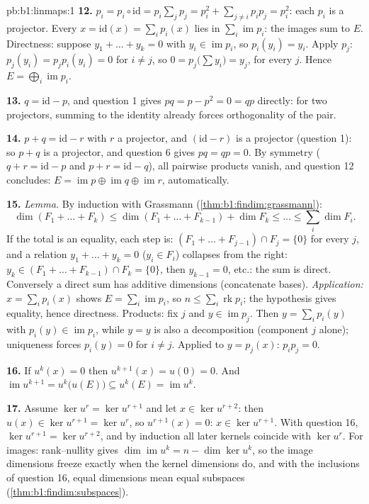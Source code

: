 \begin{solution}{pb:b1:linmaps:1}
\textbf{12.} $p_i = p_i \circ \mathrm{id} = p_i\sum_j p_j =
p_i^2 + \sum_{j \neq i} p_i p_j = p_i^2$: each $p_i$ is a
projector. Every $x = \mathrm{id}(x) = \sum_i p_i(x)$ lies in
$\sum_i \operatorname{im} p_i$: the images sum to $E$.
Directness: suppose $y_1 + \dots + y_k = 0$ with $y_i \in
\operatorname{im} p_i$, so $p_i(y_i) = y_i$. Apply $p_j$: $p_j
(y_i) = p_j p_i (y_i) = 0$ for $i \neq j$, so $0 = p_j\bigl(\sum
y_i\bigr) = y_j$, for every $j$. Hence $E = \bigoplus_i
\operatorname{im} p_i$.

\textbf{13.} $q = \mathrm{id} - p$, and question 1 gives $pq =
p - p^2 = 0 = qp$ directly: for two projectors, summing to the
identity already forces orthogonality of the pair.

\textbf{14.} $p + q = \mathrm{id} - r$ with $r$ a projector, and
$(\mathrm{id} - r)$ is a projector (question 1): so $p + q$ is a
projector, and question 6 gives $pq = qp = 0$. By symmetry ($q +
r = \mathrm{id} - p$ and $p + r = \mathrm{id} - q$), all
pairwise products vanish, and question 12 concludes: $E =
\operatorname{im} p \oplus \operatorname{im} q \oplus
\operatorname{im} r$, automatically.

\textbf{15.} \emph{Lemma.} By induction with Grassmann
(\cref{thm:b1:findim:grassmann}):
\[
\dim(F_1 + \dots + F_k) \leq \dim(F_1 + \dots + F_{k-1}) + \dim
F_k \leq \dots \leq \sum_i \dim F_i .
\]
If the total is an equality, each step is: $(F_1 + \dots +
F_{j-1}) \cap F_j = \{0\}$ for every $j$, and a relation $y_1 +
\dots + y_k = 0$ ($y_i \in F_i$) collapses from the right: $y_k
\in (F_1 + \dots + F_{k-1}) \cap F_k = \{0\}$, then $y_{k-1} =
0$, etc.: the sum is direct. Conversely a direct sum has
additive dimensions (concatenate bases). \emph{Application:}
$x = \sum_i p_i(x)$ shows $E = \sum_i \operatorname{im} p_i$,
so $n \leq \sum_i \operatorname{rk} p_i$; the hypothesis gives
equality, hence directness. Products: fix $j$ and $y \in
\operatorname{im} p_j$. Then $y = \sum_i p_i(y)$ with $p_i(y)
\in \operatorname{im} p_i$, while $y = y$ is also a
decomposition (component $j$ alone); uniqueness forces $p_i(y)
= 0$ for $i \neq j$. Applied to $y = p_j(x)$: $p_i p_j = 0$.

\textbf{16.} If $u^k(x) = 0$ then $u^{k+1}(x) = u(0) = 0$. And
$\operatorname{im} u^{k+1} = u^k\bigl(u(E)\bigr) \subseteq
u^k(E) = \operatorname{im} u^k$.

\textbf{17.} Assume $\ker u^{r} = \ker u^{r+1}$ and let $x \in
\ker u^{r+2}$: then $u(x) \in \ker u^{r+1} = \ker u^{r}$, so
$u^{r+1}(x) = 0$: $x \in \ker u^{r+1}$. With question 16,
$\ker u^{r+1} = \ker u^{r+2}$, and by induction all later
kernels coincide with $\ker u^{r}$. For images: rank--nullity
gives $\dim\operatorname{im} u^k = n - \dim\ker u^k$, so the
image dimensions freeze exactly when the kernel dimensions do,
and with the inclusions of question 16, equal dimensions mean
equal subspaces (\cref{thm:b1:findim:subspaces}).


\end{solution}

